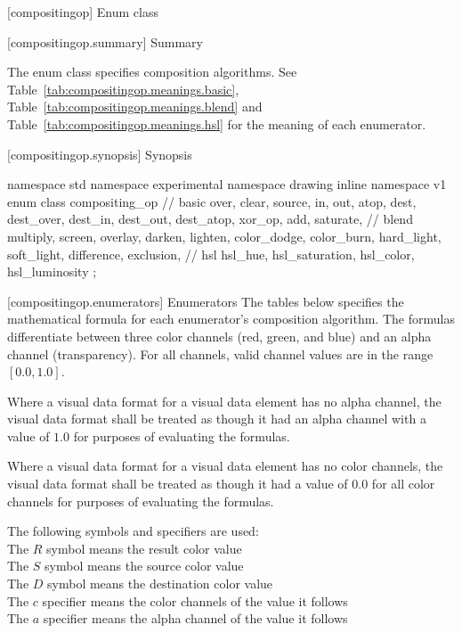  [compositingop] {Enum class }

 [compositingop.summary] { 
Summary}

\pnum
The  enum class specifies composition algorithms. See Table~\ref{tab:compositingop.meanings.basic}, 
Table~\ref{tab:compositingop.meanings.blend} and 
Table~\ref{tab:compositingop.meanings.hsl} for the meaning of 
each  enumerator.

 [compositingop.synopsis] { 
Synopsis}

\begin{codeblock}
namespace std { namespace experimental { namespace drawing { inline namespace 
v1 {
  enum class compositing_op {
    // basic
    over,
    clear,
    source,
    in,
    out,
    atop,
    dest,
    dest_over,
    dest_in,
    dest_out,
    dest_atop,
    xor_op,
    add,
    saturate,
    // blend
    multiply,
    screen,
    overlay,
    darken,
    lighten,
    color_dodge,
    color_burn,
    hard_light,
    soft_light,
    difference,
    exclusion,
    // hsl
    hsl_hue,
    hsl_saturation,
    hsl_color,
    hsl_luminosity
  };
} } } }
\end{codeblock}

 [compositingop.enumerators] { 
Enumerators}
\pnum
The tables below specifies the mathematical formula for each enumerator's composition algorithm. The formulas differentiate between three color channels (red, green, and blue) and an alpha channel (transparency). For all channels, valid channel values are in the range $[0.0, 1.0]$.

\pnum
Where a visual data format for a visual data element has no alpha channel, the visual data format shall be treated as though it had an alpha channel with a value of $1.0$ for purposes of evaluating the formulas.

\pnum
Where a visual data format for a visual data element has no color channels, the visual data format shall be treated as though it had a value of $0.0$ for all color channels for purposes of evaluating the formulas.

\pnum
The following symbols and specifiers are used:\\
\hspace*{1em}The $R$ symbol means the result color value\\
\hspace*{1em}The $S$ symbol means the source color value\\
\hspace*{1em}The $D$ symbol means the destination color value\\
\hspace*{1em}The $c$ specifier means the color channels of the value it 
follows\\
\hspace*{1em}The $a$ specifier means the alpha channel of the value it follows


